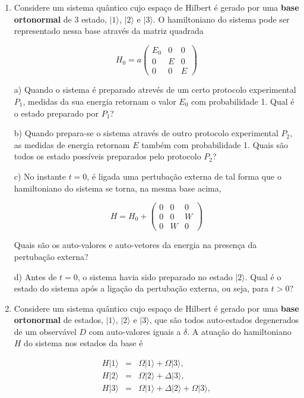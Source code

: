 \begin{enumerate}[start=1,label={\bfseries Q\arabic*.}]
\item Considere um sistema quântico cujo espaço de Hilbert é gerado por uma \textbf{base ortonormal} de 3 estado, $|1\rangle$, $|2\rangle$ e $|3\rangle$. O hamiltoniano do sistema pode ser representado nessa base através da matriz quadrada

\[ H_{0} = a \left( \begin{array}{ccc}
E_{0} & 0 & 0 \\
0 & E & 0 \\
0 & 0 & E \end{array} \right)\]


  a) Quando o sistema é preparado atrevés de um certo protocolo experimental $P_{1}$, medidas da sua energia retornam o valor $E_{0}$ com probabilidade 1. Qual é o estado preparado por $P_{1}$?

  \resposta

  b) Quando prepara-se o sistema através de outro protocolo experimental $P_{2}$, as medidas de energia retornam $E$ também com probabilidade 1. Quais são todos os estado possíveis preparados pelo protocolo $P_{2}$?

  \resposta

  c) No instante $t = 0$, é ligada uma pertubação externa de tal forma que o hamiltoniano do sistema se torna, na mesma base acima,


\[ H = H_{0} + \left( \begin{array}{ccc}
0 & 0 & 0 \\
0 & 0 & W \\
0 & W & 0 \end{array} \right)\]


Quais são os auto-valores e auto-vetores da energia na presença da pertubação externa?

  \resposta

  d) Antes de $t = 0$, o sistema havia sido preparado no estado $|2\rangle$. Qual é o estado do sistema após a ligação da pertubação externa, ou seja, para $t > 0$?

  \resposta




\item Considere um sistema quântico cujo espaço de Hilbert é gerado por uma \textbf{base ortonormal} de estados, $|1\rangle$, $|2\rangle$ e $|3\rangle$, que são todos auto-estados degenerados de um observável $D$ com auto-valores iguais a $\delta$. A atuação do hamiltoniano $H$ do sistema nos estados da base é

\begin{eqnarray*}
  H|1\rangle &=& \Omega |1\rangle + \Omega |3\rangle,\\
  H|2\rangle &=& \Omega |2\rangle + \Delta |3\rangle, \\
  H|3\rangle &=& \Omega |1\rangle + \Delta |2\rangle + \Omega |3\rangle,
\end{eqnarray*}


\end{enumerate}
